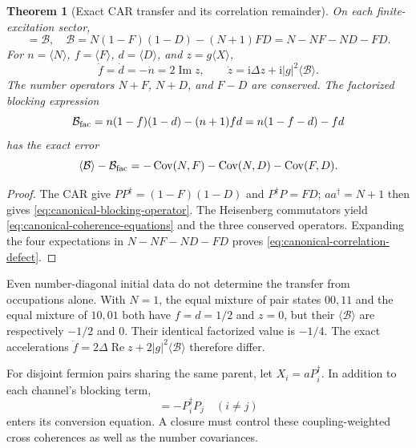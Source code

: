 \documentclass[11pt,a4paper,oneside]{book}
\theoremstyle{plain}
\newtheorem{theorem}{Theorem}[chapter]
\theoremstyle{definition}
\theoremstyle{remark}
\newcommand{\ii}{\mathrm i}
\newcommand{\Cov}{\operatorname{Cov}}
\newcommand{\src}[2]{\cite{#1}}
\begin{document}
\begin{theorem}[Exact CAR transfer and its correlation remainder]
\label{thm:canonical-blocking}
On each finite-excitation sector,
\begin{equation}
 [X^\dagger,X]=\mathcal B,
 \quad \mathcal B=N(1-F)(1-D)-(N+1)FD
              =N-NF-ND-FD.
 \label{eq:canonical-blocking-operator}
\end{equation}
For $n=\langle N\rangle$, $f=\langle F\rangle$,
$d=\langle D\rangle$, and $z=g\langle X\rangle$,
\begin{equation}
 \dot f=\dot d=-\dot n=2\operatorname{Im}z,\qquad
 \dot z=\ii\Delta z+\ii|g|^2\langle\mathcal B\rangle.
 \label{eq:canonical-coherence-equations}
\end{equation}
The number operators $N+F$, $N+D$, and $F-D$ are conserved.
The factorized blocking expression
\begin{equation}
 \mathcal B_{\rm fac}=n(1-f)(1-d)-(n+1)fd
                    =n(1-f-d)-fd
 \label{eq:pauli-collision-factor}
\end{equation}
has the exact error
\begin{equation}
 \langle\mathcal B\rangle-\mathcal B_{\rm fac}
 =-\Cov(N,F)-\Cov(N,D)-\Cov(F,D).
 \label{eq:canonical-correlation-defect}
\end{equation}
\end{theorem}
\begin{proof}
The CAR give $PP^\dagger=(1-F)(1-D)$ and $P^\dagger P=FD$;
$aa^\dagger=N+1$ then gives \eqref{eq:canonical-blocking-operator}.
The Heisenberg commutators yield \eqref{eq:canonical-coherence-equations}
and the three conserved operators.  Expanding the four expectations
in $N-NF-ND-FD$ proves \eqref{eq:canonical-correlation-defect}.
\end{proof}
\src{R20}{thm:v20v44-algebra,thm:v20v44-correlations}

Even number-diagonal initial data do not determine the transfer from
occupations alone.  With $N=1$, the equal mixture of pair states
$00,11$ and the equal mixture of $10,01$ both have $f=d=1/2$ and
$z=0$, but their $\langle\mathcal B\rangle$ are respectively $-1/2$
and $0$.  Their identical factorized value is $-1/4$.  The exact
accelerations $\ddot f=2\Delta\operatorname{Re}z+
2|g|^2\langle\mathcal B\rangle$ therefore differ.

For disjoint fermion pairs sharing the same parent, let
$X_i=aP_i^\dagger$.  In addition to each channel's blocking term,
\begin{equation}
 [X_j^\dagger,X_i]=-P_i^\dagger P_j\quad(i\ne j)
 \label{eq:shared-parent-cross-coherence}
\end{equation}
enters its conversion equation.  A closure must control these
coupling-weighted cross coherences as well as the number covariances.
\src{R20}{thm:v20v44-cross}
\end{document}
